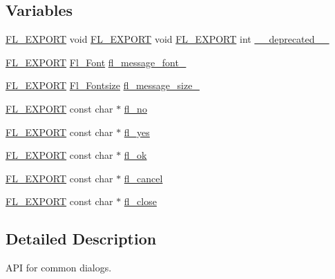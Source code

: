 \subsection*{Variables}
\begin{DoxyCompactItemize}
\item 
\hyperlink{_fl___export_8_h_aa9ba29a18aee9d738370a06eeb4470fc}{F\+L\+\_\+\+E\+X\+P\+O\+RT} void \hyperlink{_fl___export_8_h_aa9ba29a18aee9d738370a06eeb4470fc}{F\+L\+\_\+\+E\+X\+P\+O\+RT} void \hyperlink{_fl___export_8_h_aa9ba29a18aee9d738370a06eeb4470fc}{F\+L\+\_\+\+E\+X\+P\+O\+RT} int \hyperlink{fl__ask_8_h_a02c4e6adaeca801e4aa8242b93b64b9e}{\+\_\+\+\_\+deprecated\+\_\+\+\_\+}
\item 
\hyperlink{_fl___export_8_h_aa9ba29a18aee9d738370a06eeb4470fc}{F\+L\+\_\+\+E\+X\+P\+O\+RT} \hyperlink{_enumerations_8_h_a2ac46d9f082834b969fffe490a03a709}{Fl\+\_\+\+Font} \hyperlink{fl__ask_8_h_a6826a90e634ede1eddf746206cec9a63}{fl\+\_\+message\+\_\+font\+\_\+}
\item 
\hyperlink{_fl___export_8_h_aa9ba29a18aee9d738370a06eeb4470fc}{F\+L\+\_\+\+E\+X\+P\+O\+RT} \hyperlink{_enumerations_8_h_ad58927f5c691454480f7cd28362502f1}{Fl\+\_\+\+Fontsize} \hyperlink{fl__ask_8_h_a5dd951d7162e37c13e0ead53a32362fb}{fl\+\_\+message\+\_\+size\+\_\+}
\item 
\hyperlink{_fl___export_8_h_aa9ba29a18aee9d738370a06eeb4470fc}{F\+L\+\_\+\+E\+X\+P\+O\+RT} const char $\ast$ \hyperlink{fl__ask_8_h_a60a03e49d8cd4afb2f9822ca65213b0c}{fl\+\_\+no}
\item 
\hyperlink{_fl___export_8_h_aa9ba29a18aee9d738370a06eeb4470fc}{F\+L\+\_\+\+E\+X\+P\+O\+RT} const char $\ast$ \hyperlink{fl__ask_8_h_a2c91c15b1fb79a033ca9b8fb18b22c02}{fl\+\_\+yes}
\item 
\hyperlink{_fl___export_8_h_aa9ba29a18aee9d738370a06eeb4470fc}{F\+L\+\_\+\+E\+X\+P\+O\+RT} const char $\ast$ \hyperlink{fl__ask_8_h_a239425fc19b3a025ae60b6b3f39131e5}{fl\+\_\+ok}
\item 
\hyperlink{_fl___export_8_h_aa9ba29a18aee9d738370a06eeb4470fc}{F\+L\+\_\+\+E\+X\+P\+O\+RT} const char $\ast$ \hyperlink{fl__ask_8_h_a990dee2bd5b24d0ef3738fb1399ad789}{fl\+\_\+cancel}
\item 
\hyperlink{_fl___export_8_h_aa9ba29a18aee9d738370a06eeb4470fc}{F\+L\+\_\+\+E\+X\+P\+O\+RT} const char $\ast$ \hyperlink{fl__ask_8_h_a2d048a3d127ff7f2109a9f8aad7ac050}{fl\+\_\+close}
\end{DoxyCompactItemize}


\subsection{Detailed Description}
A\+PI for common dialogs. 

